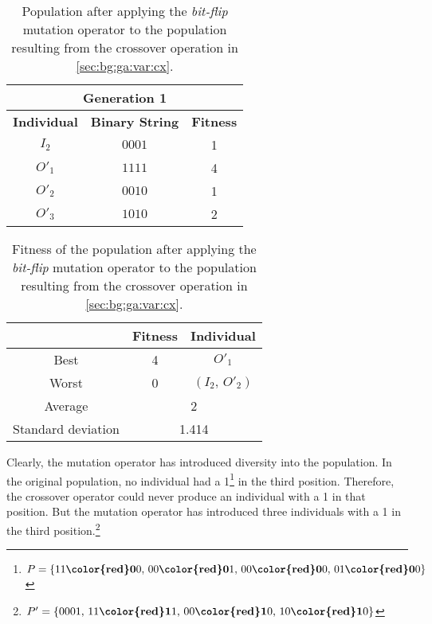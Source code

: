   \begin{table}[ht!]
    \centering
    \begin{tabular}{c | c | c }
      \multicolumn{3}{c}{\textbf{Generation 1}} \\
      \hline
      \hline
      \textbf{Individual} & \textbf{Binary String}  & \textbf{Fitness} \\
      \hline
      \(I_2\)             & \(0001\)                & 1 \\
      \(O'_1\)            & \(1111\)                & 4 \\
      \(O'_2\)            & \(0010\)                & 1 \\
      \(O'_3\)            & \(1010\)                & 2
    \end{tabular}
    \caption{
      Population after applying the \emph{bit-flip} mutation operator to the 
      population resulting from the crossover operation in 
      \vref{sec:bg:ga:var:cx}.
    }
    \label{tab:genetic_algorithms:variation:mutation:2}
  \end{table}

  \begin{table}[H]
    \centering
    \begin{tabular}{|c|c|c|}
      \hline
            & \textbf{Fitness} & \textbf{Individual}  \\
      \hline
      Best  & 4 & \(O'_1\) \\
      Worst & 0 & \((I_2,\, O'_2)\) \\
      \hline
      \hline
      Average & \multicolumn{2}{c|}{2} \\
      \hline
      Standard deviation & \multicolumn{2}{c|}{1.414} \\
      \hline
    \end{tabular}
    \caption{
      Fitness of the population after applying the \emph{bit-flip} mutation 
      operator to the population resulting from the crossover operation in
      \vref{sec:bg:ga:var:cx}.
    }
    \label{tab:genetic_algorithms:variation:mutation:fitness}
  \end{table}
 
  Clearly, the mutation operator has introduced diversity into the population.
  In the original population, no individual had a 1\footnote{
    \(P = \{
      11\textbf{{\color{red}0}}0,\, 
      00\textbf{{\color{red}0}}1,\, 
      00\textbf{{\color{red}0}}0,\, 
      01\textbf{{\color{red}0}}0
    \}\)
  } in the third position.
  Therefore, the crossover operator could never produce an individual with a 1 
  in that position.
  But the mutation operator has introduced three individuals with a 1 in the 
  third position.\footnote{
    \(P' = \{
      0001,\, 
      11\textbf{{\color{red}1}}1,\, 
      00\textbf{{\color{red}1}}0,\, 
      10\textbf{{\color{red}1}}0
    \}\)
  } 

